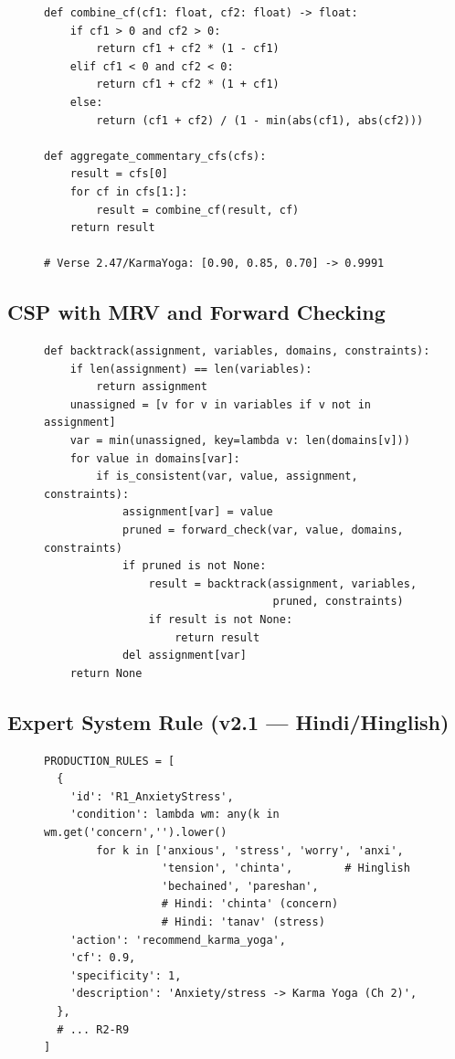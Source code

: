 \documentclass[conference]{IEEEtran}
\begin{document}
\begin{figure}[!t]
\begin{lstlisting}[language=Python3, caption={MYCIN certainty factor combination}]
def combine_cf(cf1: float, cf2: float) -> float:
    if cf1 > 0 and cf2 > 0:
        return cf1 + cf2 * (1 - cf1)
    elif cf1 < 0 and cf2 < 0:
        return cf1 + cf2 * (1 + cf1)
    else:
        return (cf1 + cf2) / (1 - min(abs(cf1), abs(cf2)))

def aggregate_commentary_cfs(cfs):
    result = cfs[0]
    for cf in cfs[1:]:
        result = combine_cf(result, cf)
    return result

# Verse 2.47/KarmaYoga: [0.90, 0.85, 0.70] -> 0.9991
\end{lstlisting}
\end{figure}

\subsection{CSP with MRV and Forward Checking}

\begin{figure}[!t]
\begin{lstlisting}[language=Python3, caption={CSP backtracking with MRV + forward checking}]
def backtrack(assignment, variables, domains, constraints):
    if len(assignment) == len(variables):
        return assignment
    unassigned = [v for v in variables if v not in assignment]
    var = min(unassigned, key=lambda v: len(domains[v]))
    for value in domains[var]:
        if is_consistent(var, value, assignment, constraints):
            assignment[var] = value
            pruned = forward_check(var, value, domains, constraints)
            if pruned is not None:
                result = backtrack(assignment, variables,
                                   pruned, constraints)
                if result is not None:
                    return result
            del assignment[var]
    return None
\end{lstlisting}
\end{figure}

\subsection{Expert System Rule (v2.1 — Hindi/Hinglish)}

\begin{figure}[!t]
\begin{lstlisting}[language=Python3, caption={Production rule with multilingual keyword support}]
PRODUCTION_RULES = [
  {
    'id': 'R1_AnxietyStress',
    'condition': lambda wm: any(k in wm.get('concern','').lower()
        for k in ['anxious', 'stress', 'worry', 'anxi',
                  'tension', 'chinta',        # Hinglish
                  'bechained', 'pareshan',
                  # Hindi: 'chinta' (concern)
                  # Hindi: 'tanav' (stress)
    'action': 'recommend_karma_yoga',
    'cf': 0.9,
    'specificity': 1,
    'description': 'Anxiety/stress -> Karma Yoga (Ch 2)',
  },
  # ... R2-R9
]
\end{lstlisting}
\end{figure}
\end{document}
